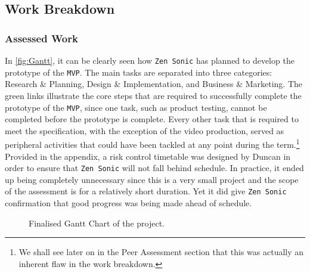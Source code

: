 \documentclass[12pt]{article}
\begin{document}
\subsection{Work Breakdown}
\subsubsection{Assessed Work}
In \autoref{fig:Gantt}, it can be clearly seen how \texttt{Zen Sonic} has planned to develop the prototype of the \texttt{MVP}. The main tasks are separated into three categories: Research \& Planning, Design \& Implementation, and Business \& Marketing. The green links illustrate the core steps that are required to successfully complete the prototype of the \texttt{MVP}, since one task, such as product testing, cannot be completed before the prototype is complete. Every other task that is required to meet the specification, with the exception of the video production, served as peripheral activities that could have been tackled at any point during the term.\footnote{We shall see later on in the Peer Assessment section that this was actually an inherent flaw in the work breakdown.} Provided in the appendix, a risk control timetable was designed by Duncan in order to ensure that \texttt{Zen Sonic} will not fall behind schedule. In practice, it ended up being completely unnecessary since this is a very small project and the scope of the assessment is for a relatively short duration. Yet it did give \texttt{Zen Sonic} confirmation that good progress was being made ahead of schedule. 
\begin{figure}[ht]
    \centering
    \caption{Finalised Gantt Chart of the project.}
    \label{fig:Gantt}
\end{figure}
\end{document}
